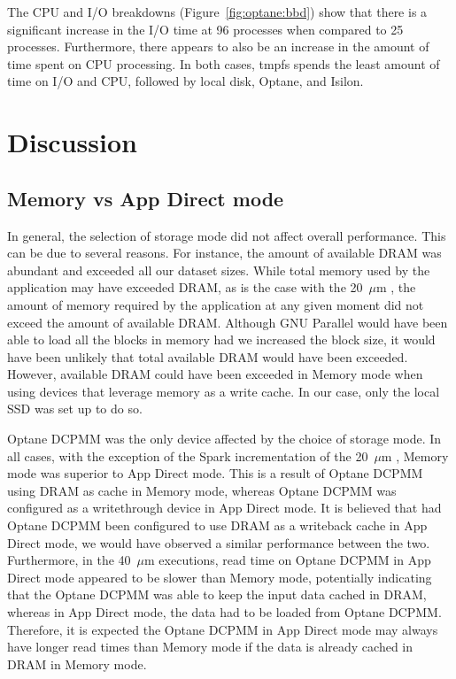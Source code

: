 The CPU and I/O breakdowns (Figure~\ref{fig:optane:bbd}) show that there is a
significant increase in the I/O time at 96 processes when compared to 25
processes. Furthermore, there appears to also be an increase in the amount of
time spent on CPU processing. In both cases, tmpfs spends the least amount of
time on I/O and CPU, followed by local disk, Optane, and Isilon.
\section{Discussion}
\subsection{Memory vs App Direct mode}

In general, the selection of storage mode did not affect overall performance.
This can be due to several reasons. For instance, the amount of available DRAM
was abundant and exceeded all our dataset sizes. While total memory used by the
application may have exceeded DRAM, as is the case with the 20~$\mu$m \bigbrain,
the amount of memory required by the application at any given moment did not
exceed the amount of available DRAM. Although GNU Parallel would have been able
to load all the blocks in memory had we increased the block size, it would have
been unlikely that total available DRAM would have been exceeded. However,
available DRAM could have been exceeded in Memory mode when using devices that
leverage memory as a write cache. In our case, only the local SSD was set up to
do so.

Optane DCPMM was the only device affected by the choice of storage mode. In all
cases, with the exception of the Spark incrementation of the 20~$\mu$m
\bigbrain, Memory mode was superior to App Direct mode. This is a result of
Optane DCPMM using DRAM as cache in Memory mode, whereas Optane DCPMM was
configured as a writethrough device in App Direct mode. It is believed that had
Optane DCPMM been configured to use DRAM as a writeback cache in App Direct
mode, we would have observed a similar performance between the two. Furthermore,
in the 40~$\mu$m \bigbrain executions, read time on Optane DCPMM in App Direct
mode appeared to be slower than Memory mode, potentially indicating that the
Optane DCPMM was able to keep the input data cached in DRAM, whereas in App
Direct mode, the data had to be loaded from Optane DCPMM. Therefore, it is
expected the Optane DCPMM in App Direct mode may always have longer read times
than Memory mode if the data is already cached in DRAM in Memory mode.

